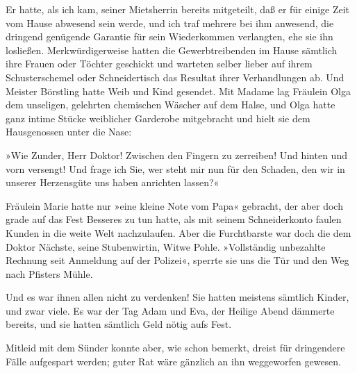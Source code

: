 Er hatte, als ich kam, seiner Mietsherrin bereits mitgeteilt, daß
er für einige Zeit vom Hause abwesend sein werde, und ich traf
mehrere bei ihm anwesend, die dringend genügende Garantie für sein
Wiederkommen verlangten, ehe sie ihn losließen. Merkwürdigerweise
hatten die Gewerbtreibenden im Hause sämtlich ihre Frauen oder
Töchter geschickt und warteten selber lieber auf ihrem
Schusterschemel oder Schneidertisch das Resultat ihrer
Verhandlungen ab. Und Meister Börstling hatte Weib und Kind
gesendet. Mit Madame lag Fräulein Olga dem unseligen, gelehrten
chemischen Wäscher auf dem Halse, und Olga hatte ganz intime Stücke
weiblicher Garderobe mitgebracht und hielt sie dem Hausgenossen
unter die Nase:

»Wie Zunder, Herr Doktor! Zwischen den Fingern zu zerreiben! Und
hinten und vorn versengt! Und frage ich Sie, wer steht mir nun für
den Schaden, den wir in unserer Herzensgüte uns haben anrichten
lassen?«

Fräulein Marie hatte nur »eine kleine Note vom Papa« gebracht, der
aber doch grade auf das Fest Besseres zu tun hatte, als mit seinem
Schneiderkonto faulen Kunden in die weite Welt nachzulaufen. Aber
die Furchtbarste war doch die dem Doktor Nächste, seine
Stubenwirtin, Witwe Pohle. »Vollständig unbezahlte Rechnung seit
Anmeldung auf der Polizei«, sperrte sie uns die Tür und den Weg
nach Pfisters Mühle.

Und es war ihnen allen nicht zu verdenken! Sie hatten meistens
sämtlich Kinder, und zwar viele. Es war der Tag Adam und Eva, der
Heilige Abend dämmerte bereits, und sie hatten sämtlich Geld nötig
aufs Fest.

Mitleid mit dem Sünder konnte aber, wie schon bemerkt, dreist für
dringendere Fälle aufgespart werden; guter Rat wäre gänzlich an ihn
weggeworfen gewesen.

